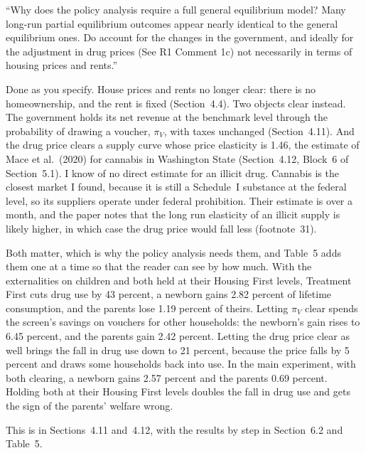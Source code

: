 \documentclass[11pt]{article}
\begin{document}
\begin{referee}
``Why does the policy analysis require a full general equilibrium model? Many
long-run partial equilibrium outcomes appear nearly identical to the general
equilibrium ones. Do account for the changes in the government, and ideally for
the adjustment in drug prices (See R1 Comment 1c) not necessarily in terms of
housing prices and rents.''
\end{referee}
\begin{response}
Done as you specify. House prices and rents no longer clear: there is no
homeownership, and the rent is fixed (Section~4.4). Two objects clear instead. The
government holds its net revenue at the benchmark level through the probability of
drawing a voucher, $\pi_V$, with taxes unchanged (Section~4.11). And the drug price
clears a supply curve whose price elasticity is 1.46, the estimate of Mace et al.\
(2020) for cannabis in Washington State (Section~4.12, Block~6 of Section~5.1). I
know of no direct estimate for an illicit drug. Cannabis is the closest market I
found, because it is still a Schedule~I substance at the federal level, so its
suppliers operate under federal prohibition. Their estimate is over a month, and
the paper notes that the long run elasticity of an illicit supply is likely higher,
in which case the drug price would fall less (footnote~31).

Both matter, which is why the policy analysis needs them, and Table~5 adds them
one at a time so that the reader can see by how much. With the externalities on
children and both held at their Housing First levels, Treatment First cuts drug
use by 43 percent, a newborn gains 2.82 percent of lifetime consumption, and the
parents lose 1.19 percent of theirs. Letting $\pi_V$ clear spends the screen's
savings on vouchers for other households: the newborn's gain rises to 6.45 percent,
and the parents gain 2.42 percent. Letting the drug price clear as well brings the
fall in drug use down to 21 percent, because the price falls by 5 percent and draws
some households back into use. In the main experiment, with both clearing, a
newborn gains 2.57 percent and the parents 0.69 percent. Holding both at their
Housing First levels doubles the fall in drug use and gets the sign of the parents'
welfare wrong.

This is in Sections~4.11 and~4.12, with the results by step in Section~6.2 and
Table~5.
\end{response}
\end{document}

